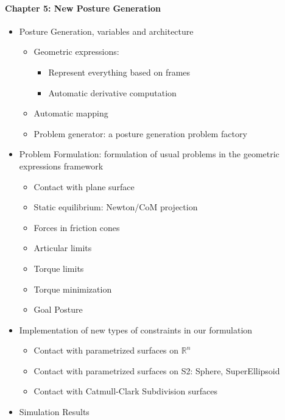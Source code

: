 \documentclass{article}
\begin{document}

\paragraph{Chapter 5: New Posture Generation}
\begin{itemize}
  \item{Posture Generation, variables and architecture}
    \begin{itemize}
      \item Geometric expressions:
        \begin{itemize}
          \item Represent everything based on frames
          \item Automatic derivative computation
        \end{itemize}
      \item Automatic mapping
      \item Problem generator: a posture generation problem factory
    \end{itemize}
  \item{Problem Formulation: formulation of usual problems in the geometric expressions framework}
    \begin{itemize}
      \item Contact with plane surface
      \item Static equilibrium: Newton/CoM projection
      \item Forces in friction cones
      \item Articular limits
      \item Torque limits
      \item Torque minimization
      \item Goal Posture
    \end{itemize}
  \item{Implementation of new types of constraints in our formulation}
    \begin{itemize}
      \item Contact with parametrized surfaces on $\mathbb{R}^n$
      \item Contact with parametrized surfaces on S2: Sphere, SuperEllipsoid
      \item Contact with Catmull-Clark Subdivision surfaces
    \end{itemize}
  \item{Simulation Results}
\end{itemize}
\end{document}
